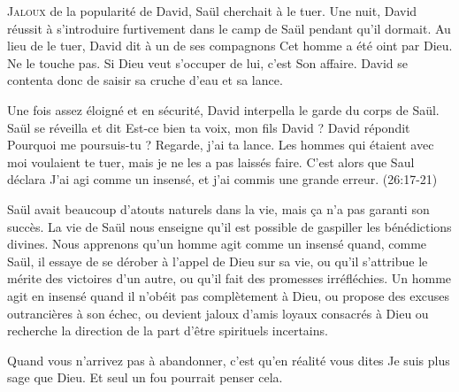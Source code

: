 


\lettrine{J}{aloux} de la popularité de David, Saül cherchait à le tuer.
 Une nuit, David réussit à s'introduire furtivement dans le camp de Saül
 pendant qu'il dormait. Au lieu de le tuer, David dit à un de ses compagnons\frcolon{}
 \Og Cet homme a été oint par Dieu. Ne le touche pas.
 Si Dieu veut s'occuper de lui, c'est Son affaire. \Fg{}
 David se contenta donc de saisir sa cruche d'eau et sa lance.

Une fois assez éloigné et en sécurité, David interpella
 le garde du corps de Saül.
 Saül se réveilla et dit\frcolon{}
 \Og Est-ce bien ta voix, mon fils David ? \Fg{}
 David répondit\frcolon{}
 \Og Pourquoi me poursuis-tu ? Regarde, j'ai ta lance.
 Les hommes qui étaient avec moi voulaient te tuer,
 mais je ne les a pas laissés faire. \Fg{}
 C'est alors que Saul déclara\frcolon{}
 \Og J'ai agi comme un insensé, et j'ai commis une grande erreur. \Fg{}
 (26:17-21)

Saül avait beaucoup d'atouts naturels dans la vie,
 mais \c{c}a n'a pas garanti son succès.
 La vie de Saül nous enseigne qu'il est possible
 de gaspiller les bénédictions divines.
 Nous apprenons qu'un homme agit comme un insensé quand,
 comme Saül, il essaye de se dérober à l'appel de Dieu sur sa vie,
 ou qu'il s'attribue le mérite des victoires d'un autre,
 ou qu'il fait des promesses irréfléchies.
 Un homme agit en insensé quand il n'obéit pas complètement à Dieu,
 ou propose des excuses outrancières à son échec,
 ou devient jaloux d'amis loyaux consacrés à Dieu
 ou recherche la direction de la part d'être spirituels incertains.


Quand vous n'arrivez pas à abandonner, c'est qu'en réalité vous dites\frcolon{}
 \Og Je suis plus sage que Dieu. \Fg{}
 Et seul un fou pourrait penser cela. 

\dvrule






